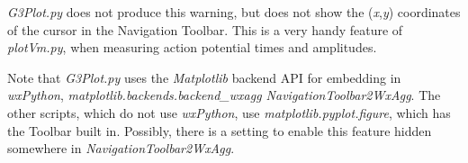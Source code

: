 \documentclass[12pt]{article}
\begin{document}
{\it G3Plot.py} does not produce this warning, but does not show the ({\it x},{\it y})
coordinates of the cursor in the Navigation Toolbar.  This is a very handy
feature of {\it plotVm.py}, when measuring action potential times and amplitudes.

Note that {\it G3Plot.py} uses the {\it Matplotlib} backend API for embedding in {\it wxPython},
{\it matplotlib.backends.backend\_wxagg NavigationToolbar2WxAgg}.  The other
scripts, which do not use {\it wxPython}, use {\it matplotlib.pyplot.figure}, which has
the Toolbar built in.  Possibly, there is a setting to enable this feature
hidden somewhere in {\it NavigationToolbar2WxAgg}.



\end{document}
